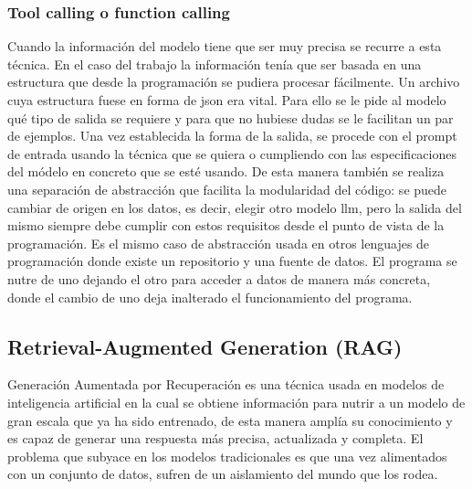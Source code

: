 	\subsubsection{Tool calling o function calling}
	Cuando la información del modelo tiene que ser muy precisa se recurre a esta técnica. En el caso del trabajo la información tenía que ser basada en una estructura que desde la programación se pudiera procesar fácilmente. Un archivo cuya estructura fuese en forma de json era vital. Para ello se le pide al modelo qué tipo de salida se requiere y para que no hubiese dudas se le facilitan un par de ejemplos. Una vez establecida la forma de la salida, se procede con el prompt de entrada usando la técnica que se quiera o cumpliendo con las especificaciones del módelo en concreto que se esté usando.
	De esta manera también se realiza una separación de abstracción que facilita la modularidad del código: se puede cambiar de origen en los datos, es decir, elegir otro modelo \acrshort{llm}, pero la salida del mismo siempre debe cumplir con estos requisitos desde el punto de vista de la programación. Es el mismo caso de abstracción usada en otros lenguajes de programación donde existe un repositorio y una fuente de datos. El programa se nutre de uno dejando el otro para acceder a datos de manera más concreta, donde el cambio de uno deja inalterado el funcionamiento del programa.
	
	\subsection{Retrieval-Augmented Generation (RAG)}
	Generación Aumentada por Recuperación es una técnica usada en modelos de inteligencia artificial en la cual se obtiene información para nutrir a un modelo de gran escala que ya ha sido entrenado, de esta manera amplía su conocimiento y es capaz de generar una respuesta más precisa, actualizada y completa. 
	El problema que subyace en los modelos tradicionales es que una vez alimentados con un conjunto de datos, sufren de un aislamiento del mundo que los rodea.
	

